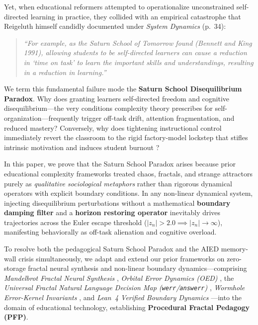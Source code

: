 \documentclass[10pt,twocolumn,a4paper]{article}
\begin{document}
Yet, when educational reformers attempted to operationalize unconstrained self-directed learning in practice, they collided with an empirical catastrophe that Reigeluth himself candidly documented under \textit{System Dynamics} (p.~34):

\begin{quote}
\small
\textit{``For example, as the Saturn School of Tomorrow found (Bennett and King 1991), allowing students to be self-directed learners can cause a reduction in `time on task' to learn the important skills and understandings, resulting in a reduction in learning.''} \cite[p.~34]{reigeluth2008chaos}
\end{quote}

We term this fundamental failure mode the \textbf{Saturn School Disequilibrium Paradox}. Why does granting learners self-directed freedom and cognitive disequilibrium—the very conditions complexity theory prescribes for self-organization—frequently trigger off-task drift, attention fragmentation, and reduced mastery? Conversely, why does tightening instructional control immediately revert the classroom to the rigid factory-model lockstep that stifles intrinsic motivation and induces student burnout \cite{sweller1988cognitive}?

In this paper, we prove that the Saturn School Paradox arises because prior educational complexity frameworks treated chaos, fractals, and strange attractors purely as \textit{qualitative sociological metaphors} rather than rigorous dynamical operators with explicit boundary conditions. In any non-linear dynamical system, injecting disequilibrium perturbations without a mathematical \textbf{boundary damping filter} and a \textbf{horizon restoring operator} inevitably drives trajectories across the Euler escape threshold ($|z_n| > 2.0 \implies |z_n| \to \infty$), manifesting behaviorally as off-task alienation and cognitive overload.

To resolve both the pedagogical Saturn School Paradox and the AIED memory-wall crisis simultaneously, we adapt and extend our prior frameworks on zero-storage fractal neural synthesis and non-linear boundary dynamics—comprising \textit{Mandelbrot Fractal Neural Synthesis} \cite{dagli2026mandelbrot}, \textit{Orbital Error Dynamics (OED)} \cite{dagli2026oed}, the \textit{Universal Fractal Natural Language Decision Map (\texttt{werr}/\texttt{answerr})} \cite{dagli2026werr}, \textit{Wormhole Error-Kernel Invariants} \cite{dagli2026pagecurve}, and \textit{Lean~4 Verified Boundary Dynamics} \cite{dagli2026lean4,dagli2026werracle}—into the domain of educational technology, establishing \textbf{Procedural Fractal Pedagogy (PFP)}.
\end{document}
